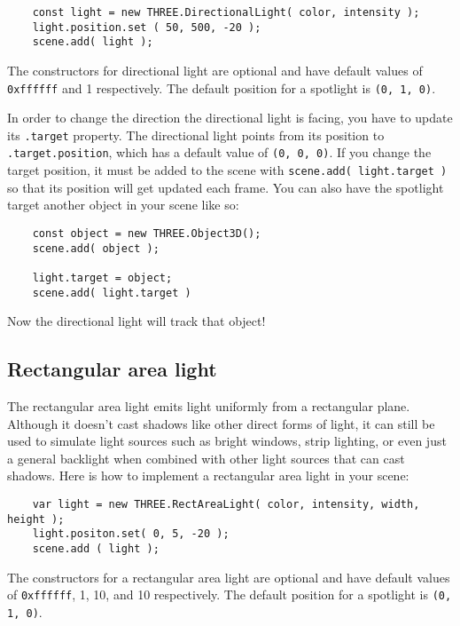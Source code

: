 \documentclass[10pt,final,journal,compsoc]{IEEEtran}
\begin{document}
    \begin{lstlisting}
    const light = new THREE.DirectionalLight( color, intensity );
    light.position.set ( 50, 500, -20 );
    scene.add( light );
    \end{lstlisting}
    
    The constructors for directional light are optional and have default values of \verb|0xffffff| and 1 respectively. The default position for a spotlight is \verb|(0, 1, 0)|.
    
    In order to change the direction the directional light is facing, you have to update its \verb|.target| property. The directional light points from its position to \verb|.target.position|, which has a default value of \verb|(0, 0, 0)|. If you change the target position, it must be added to the scene with \verb|scene.add( light.target )| so that its position will get updated each frame. You can also have the spotlight target another object in your scene like so:
    
    \begin{lstlisting}
    const object = new THREE.Object3D();
    scene.add( object );
    
    light.target = object;
    scene.add( light.target )
    \end{lstlisting}
    
    Now the directional light will track that object!
    
    \subsection{Rectangular area light}
    The rectangular area light emits light uniformly from a rectangular plane. Although it doesn't cast shadows like other direct forms of light, it can still be used to simulate light sources such as bright windows, strip lighting, or even just a general backlight when combined with other light sources that can cast shadows. Here is how to implement a rectangular area light in your scene:
    
    \begin{lstlisting}
    var light = new THREE.RectAreaLight( color, intensity, width, height );
    light.positon.set( 0, 5, -20 );
    scene.add ( light );
    \end{lstlisting}
    
    The constructors for a rectangular area light are optional and have default values of \verb|0xffffff|, 1, 10, and 10 respectively. The default position for a spotlight is \verb|(0, 1, 0)|.
    
\end{document}
